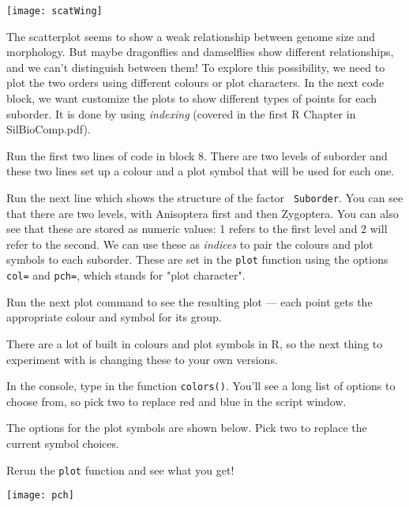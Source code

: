 \begin{center}
\texttt{[image: scatWing]} 
\end{center}
The scatterplot seems to show a weak relationship between 
genome size and morphology. But maybe dragonflies and damselflies show 
different relationships, and we can't distinguish between them! To 
explore this possibility, we need to plot the two orders using 
different colours or plot characters. In the next code block, we want 
customize the plots to show different types of points for each 
suborder. It is done by using {\it indexing} (covered in the first R Chapter in SilBioComp.pdf).

\begin{compactitem}[$\quad\star$]
\item Run the first two lines of code in block 8. There are two levels 
of suborder and these two lines set up a colour and a plot symbol that 
will be used for each one.
\item Run the next line which shows the structure of the factor {\tt 
Suborder}. You can see that there are two levels, with Anisoptera first 
and then Zygoptera. You can also see that these are stored as numeric 
values: 1 refers to the first level and 2 will refer to the second. We 
can use these as {\it indices} to pair the colours and plot symbols to 
each suborder. These are set in the {\tt plot} function using the 
options {\tt col=} and {\tt pch=}, which stands for "plot character".
\item Run the next plot command  to see the resulting plot --- each 
point gets the appropriate colour and symbol for its group.
\end{compactitem}
 
There are a lot of built in colours and plot symbols in R, so the next 
thing to experiment with is changing these to your own versions.

\begin{compactitem}[$\quad\star$]
\item In the console, type in the function {\tt colors()}. You'll see a 
long list of options to choose from, so pick two to replace red and 
blue in the script window.
\item The options for the plot symbols are shown below. Pick two to 
replace the current symbol choices.
\item Rerun the {\tt plot} function and see what you get!
\end{compactitem}

\begin{center}
    \texttt{[image: pch]} 
\end{center}
	
